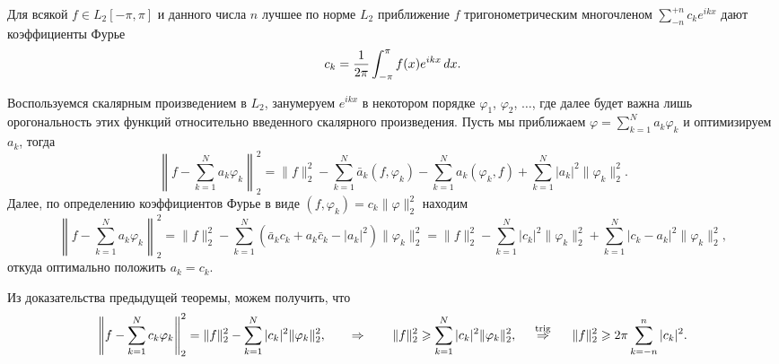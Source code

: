 

\begin{to_thr}
    Для всякой $f \in L_2[-\pi, \pi]$ и данного числа $n$ лучшее по норме $L_2$ приближение $f$ тригонометрическим многочленом $\sum_{-n}^{+n} c_k e^{ikx}$ дают коэффициенты Фурье
    \begin{equation*}
        c_k = \frac{1}{2\pi} \int_{-\pi}^{\pi} f(x) e^{ikx} \d x.
    \end{equation*}
\end{to_thr}

\begin{uproof}
    Воспользуемся скалярным произведением в $L_2$, занумеруем $e^{ikx}$ в некотором порядке $\varphi_1$, $\varphi_2$, $\ldots$, где далее будет важна лишь орогональность этих функций относительно введенного скалярного произведения. Пусть мы приближаем $\varphi = \sum_{k=1}^N a_k \varphi_k$ и оптимизируем $a_k$, тогда
    \begin{equation*}
        \left\|
            f - \sum_{k=1}^{N} a_k \varphi_k
        \right\|_2^2 = \|f\|_2^2 - 
        \sum_{k=1}^{N} \bar{a}_k (f, \varphi_k) - \sum_{k=1}^{N} a_k (\varphi_k, f) + \sum_{k=1}^{N} |a_k|^2 \|\varphi_k\|_2^2.
    \end{equation*}
    Далее, по определению коэффициентов Фурье в виде $(f, \varphi_k) = c_k \|\varphi\|_2^2$ находим
    \begin{equation*}
        \left\|
            f - \sum_{k=1}^{N} a_k \varphi_k
        \right\|_2^2 = \|f\|_2^2 - \sum_{k=1}^{N} \left(
            \bar{a}_k c_k + a_k \bar{c}_k - |a_k|^2
        \right) \|\varphi_k\|_2^2 = 
        \|f\|_2^2 - \sum_{k=1}^{N} |c_k|^2 \|\varphi_k\|_2^2 + \sum_{k=1}^{N} |c_k - a_k|^2 \|\varphi_k\|_2^2,
    \end{equation*}
    откуда оптимально положить $a_k = c_k$. 
\end{uproof}


\begin{to_lem}
    Из доказательства предыдущей теоремы, можем получить, что
    \begin{equation*}
        \left\|f - \sum_{k=1}^N c_k \varphi_k \right\|_2^2 = 
        \|f\|_2^2 - \sum_{k=1}^{N} |c_k|^2 \|\varphi_k\|_2^2,
        \hspace{0.7 cm} \Rightarrow \hspace{0.7   cm}
        \|f\|_2^2 \geq  \sum_{k=1}^{N} |c_k|^2 \|\varphi_k\|^2_2,
        \hspace{0.5cm} \overset{\mathrm{trig}}{\Rightarrow}  \hspace{0.5cm}
        \|f\|_2^2 \geq 2\pi \sum_{k=-n}^n |c_k|^2.
    \end{equation*}
\end{to_lem}

